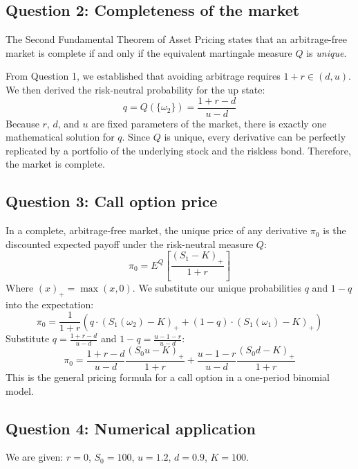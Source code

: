 \subsection*{Question 2: Completeness of the market}
The Second Fundamental Theorem of Asset Pricing states that an arbitrage-free market is complete if and only if the equivalent martingale measure $Q$ is \textit{unique}.

From Question 1, we established that avoiding arbitrage requires $1+r \in (d,u)$. We then derived the risk-neutral probability for the up state:
\begin{equation}
    q = Q(\{\omega_2\}) = \frac{1+r-d}{u-d}
\end{equation}
Because $r$, $d$, and $u$ are fixed parameters of the market, there is exactly one mathematical solution for $q$. Since $Q$ is unique, every derivative can be perfectly replicated by a portfolio of the underlying stock and the riskless bond. Therefore, the market is complete.

\subsection*{Question 3: Call option price}
In a complete, arbitrage-free market, the unique price of any derivative $\pi_0$ is the discounted expected payoff under the risk-neutral measure $Q$:
\begin{equation}
    \pi_0 = E^Q\left[\frac{(S_1 - K)_+}{1+r}\right]
\end{equation}
Where $(x)_+ = \max(x, 0)$. We substitute our unique probabilities $q$ and $1-q$ into the expectation:
\begin{equation}
    \pi_0 = \frac{1}{1+r} \left( q \cdot (S_1(\omega_2) - K)_+ + (1-q) \cdot (S_1(\omega_1) - K)_+ \right)
\end{equation}
Substitute $q = \frac{1+r-d}{u-d}$ and $1-q = \frac{u-1-r}{u-d}$:
\begin{equation}
    \pi_0 = \frac{1+r-d}{u-d} \frac{(S_0 u - K)_+}{1+r} + \frac{u-1-r}{u-d} \frac{(S_0 d - K)_+}{1+r}
\end{equation}
This is the general pricing formula for a call option in a one-period binomial model.

\subsection*{Question 4: Numerical application}
We are given: $r = 0$, $S_0 = 100$, $u = 1.2$, $d = 0.9$, $K = 100$.

